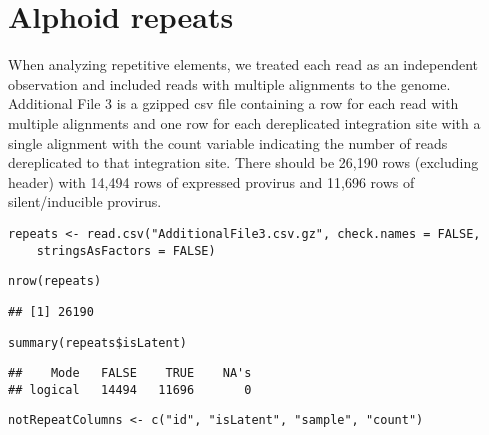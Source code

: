 \documentclass[../../sherrill-Mix_thesis.tex]{subfiles}
\makeatletter
\newenvironment{kframe}{%
 \def\at@end@of@kframe{}%
 \ifinner\ifhmode%
  \def\at@end@of@kframe{\end{minipage}}%
  \begin{minipage}{\columnwidth}%
 \fi\fi%
 \def\FrameCommand##1{\hskip\@totalleftmargin \hskip-\fboxsep
 \colorbox{shadecolor}{##1}\hskip-\fboxsep
     \hskip-\linewidth \hskip-\@totalleftmargin \hskip\columnwidth}%
 \MakeFramed {\advance\hsize-\width
   \@totalleftmargin\z@ \linewidth\hsize
   \@setminipage}}%
 {\par\unskip\endMakeFramed%
 \at@end@of@kframe}
\newenvironment{knitrout}{}{} %
\makeatother
\begin{document}
\section{Alphoid repeats}
When analyzing repetitive elements, we treated each read as an independent observation and included reads with multiple alignments to the genome. Additional File 3 is a gzipped csv file containing a row for each read with multiple alignments and one row for each dereplicated integration site with a single alignment with the count variable indicating the number of reads dereplicated to that integration site. There should be 26,190 rows (excluding header) with 14,494 rows of expressed provirus and 11,696 rows of silent/inducible provirus.
\begin{knitrout}
\color{fgcolor}\begin{kframe}
\begin{lstlisting}[basicstyle=\ttfamily,breaklines=true]
repeats <- read.csv("AdditionalFile3.csv.gz", check.names = FALSE, 
    stringsAsFactors = FALSE)\end{lstlisting}
\begin{lstlisting}[basicstyle=\ttfamily,breaklines=true]
nrow(repeats)\end{lstlisting}
\begin{lstlisting}[basicstyle=\ttfamily,breaklines=true]
## [1] 26190
\end{lstlisting}
\begin{lstlisting}[basicstyle=\ttfamily,breaklines=true]
summary(repeats$isLatent)\end{lstlisting}
\begin{lstlisting}[basicstyle=\ttfamily,breaklines=true]
##    Mode   FALSE    TRUE    NA's 
## logical   14494   11696       0
\end{lstlisting}
\begin{lstlisting}[basicstyle=\ttfamily,breaklines=true]
notRepeatColumns <- c("id", "isLatent", "sample", "count")\end{lstlisting}
\end{kframe}
\end{knitrout}
\end{document}
